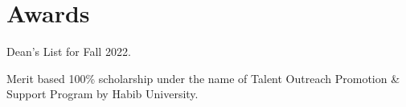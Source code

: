\documentclass[]{resume}
\begin{document}
\begin{minipage}[t]{0.5\textwidth}
    \section{Awards}
    \sectionsep
    \begin{tightemize}
        \item Dean's List for Fall 2022.
        \item Merit based 100\% scholarship under the name of Talent Outreach Promotion \& Support Program by Habib University.
    \end{tightemize}


\end{minipage}
\end{document}
